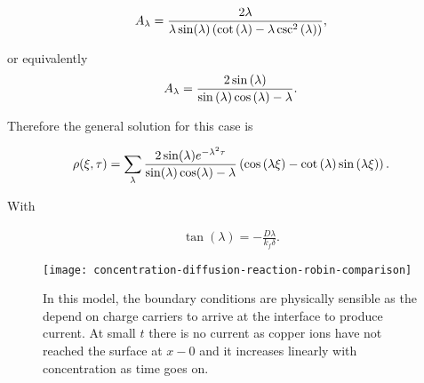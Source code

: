 \begin{align}
A_{\lambda} = \frac{2\lambda}{\lambda \sin(\lambda)\left({\cot\left({\lambda}\right) -  \lambda \csc^2\left({\lambda}\right)}\right)},
\end{align}

or equivalently
\begin{align}
A_{\lambda} = \frac{2 \sin\left({\lambda}\right)}{\sin\left({\lambda}\right)\cos\left({\lambda}\right)-\lambda}.
\end{align}

Therefore the general solution for this case is

\begin{align}
	\rho(\xi,\tau) = \sum_\lambda  \frac{2\sin(\lambda)e^{-\lambda^2\tau}}{\sin(\lambda)\cos(\lambda)-\lambda}\left({\cos{(\lambda\xi)} - \cot\left({\lambda}\right)\sin\left({\lambda\xi}\right)}\right).
\end{align}

With 

\begin{align}
	\tan(\lambda) = -\frac{D\lambda}{k_f\delta}.
\end{align}






\begin{figure}[htbp]
\centering
\texttt{[image: concentration-diffusion-reaction-robin-comparison]}
\caption{In this model, the boundary conditions are physically sensible as the depend on charge carriers to arrive at the interface to produce current. At small $t$ there is no current as copper ions have not reached the surface at $x-0$ and it increases linearly with concentration as time goes on.}
\label{fig:diffusion-reaction-comparison}
\end{figure}
